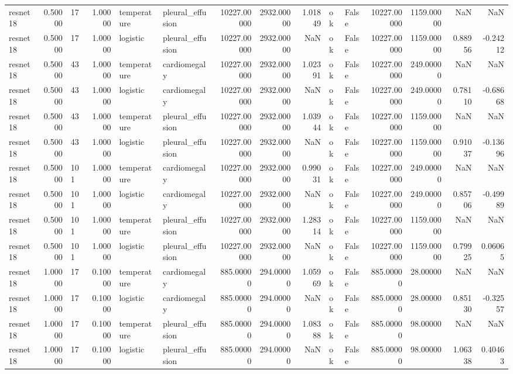 \begin{tabular}{lrlrllrrrllrrrr}
resnet18 & 0.50000 & 17 & 1.00000 & temperature & pleural\_effusion & 10227.00000 & 2932.00000 & 1.01849 & ok & False & 10227.00000 & 1159.00000 & NaN & NaN \\
resnet18 & 0.50000 & 17 & 1.00000 & logistic & pleural\_effusion & 10227.00000 & 2932.00000 & NaN & ok & False & 10227.00000 & 1159.00000 & 0.88956 & -0.24212 \\
resnet18 & 0.50000 & 43 & 1.00000 & temperature & cardiomegaly & 10227.00000 & 2932.00000 & 1.02391 & ok & False & 10227.00000 & 249.00000 & NaN & NaN \\
resnet18 & 0.50000 & 43 & 1.00000 & logistic & cardiomegaly & 10227.00000 & 2932.00000 & NaN & ok & False & 10227.00000 & 249.00000 & 0.78110 & -0.68668 \\
resnet18 & 0.50000 & 43 & 1.00000 & temperature & pleural\_effusion & 10227.00000 & 2932.00000 & 1.03944 & ok & False & 10227.00000 & 1159.00000 & NaN & NaN \\
resnet18 & 0.50000 & 43 & 1.00000 & logistic & pleural\_effusion & 10227.00000 & 2932.00000 & NaN & ok & False & 10227.00000 & 1159.00000 & 0.91037 & -0.13696 \\
resnet18 & 0.50000 & 101 & 1.00000 & temperature & cardiomegaly & 10227.00000 & 2932.00000 & 0.99031 & ok & False & 10227.00000 & 249.00000 & NaN & NaN \\
resnet18 & 0.50000 & 101 & 1.00000 & logistic & cardiomegaly & 10227.00000 & 2932.00000 & NaN & ok & False & 10227.00000 & 249.00000 & 0.85706 & -0.49989 \\
resnet18 & 0.50000 & 101 & 1.00000 & temperature & pleural\_effusion & 10227.00000 & 2932.00000 & 1.28314 & ok & False & 10227.00000 & 1159.00000 & NaN & NaN \\
resnet18 & 0.50000 & 101 & 1.00000 & logistic & pleural\_effusion & 10227.00000 & 2932.00000 & NaN & ok & False & 10227.00000 & 1159.00000 & 0.79925 & 0.06065 \\
resnet18 & 1.00000 & 17 & 0.10000 & temperature & cardiomegaly & 885.00000 & 294.00000 & 1.05969 & ok & False & 885.00000 & 28.00000 & NaN & NaN \\
resnet18 & 1.00000 & 17 & 0.10000 & logistic & cardiomegaly & 885.00000 & 294.00000 & NaN & ok & False & 885.00000 & 28.00000 & 0.85130 & -0.32557 \\
resnet18 & 1.00000 & 17 & 0.10000 & temperature & pleural\_effusion & 885.00000 & 294.00000 & 1.08388 & ok & False & 885.00000 & 98.00000 & NaN & NaN \\
resnet18 & 1.00000 & 17 & 0.10000 & logistic & pleural\_effusion & 885.00000 & 294.00000 & NaN & ok & False & 885.00000 & 98.00000 & 1.06338 & 0.40463 \\

\end{tabular}
